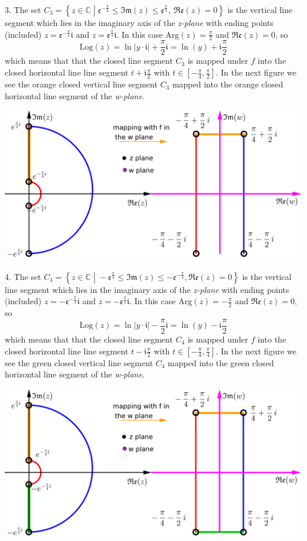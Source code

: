 \documentclass[11pt]{amsart}
\newcommand{\dsp}{\displaystyle}
\newcommand{\BBC}{\mathbb{C}}\newcommand{\mi}{\mathfrak{i}}
\begin{document}
3. The set $\dsp
C_3=\left\{z\in\BBC\;\left|\;\mathfrak{e}^{-\frac{\pi}{4}}\leq\mathfrak{Im}
(z)\leq\mathfrak { e } ^ {\frac{\pi}{4}}, \
\mathfrak{Re}(z)=0\right.\right\}$ is the vertical line segment which lies in the 
imaginary axis of the \textit{z-plane} with ending points (included)
$\dsp z=\mathfrak{e}^{-\frac{\pi}{4}}\mi$ and $z=\mathfrak{e}^{\frac{\pi}{4}}\mi$. In this case $\dsp\textrm{Arg}(z)=\frac{\pi}{2}$ and 
$\dsp\mathfrak{Re}(z)=0$, so \[\textrm{Log}(z)=\ln|y\cdot \mi|+\frac{\pi}{2}\mi=\ln⁡(y)+\mi\frac{\pi}{2}\] which means that that the 
closed line segment $C_3$ is mapped under $f$ into the closed horizontal line line 
segment $\dsp t+\mi\frac{\pi}{2}$ with 
$t\in\left[-\frac{\pi}{4},\frac{\pi}{2}\right]$. In the next figure we see the orange closed vertical line segment $C_3$ mapped into the 
orange closed horizontal line segment of the \textit{w-plane}.
\begin{center}\includegraphics{2c.png}\end{center}
4.  The set 
$C_4=\left\{z\in\BBC\;\left|\;-\mathfrak{e}^{\frac{\pi}{4}}\leq\mathfrak{Im}
(z)\leq-\mathfrak { e }^{-\frac{\pi}{4}}, \mathfrak{Re}(z)=0
\right.\right\}$ is the vertical line segment which lies in the imaginary axis of the 
\textit{z-plane} with ending points (included) 
$\dsp z=-\mathfrak{e}^{-\frac{\pi}{4}}\mi$ and $\dsp z=-\mathfrak{e}^{\frac{\pi}{4}}\mi$. In this case $\dsp\textrm{Arg}(z)=-\frac{\pi}{2}$ 
and $\dsp\mathfrak{Re}(z)=0$, so \[\textrm{Log}(z)=\ln|y\cdot \mi|−\frac{\pi}{2}\mi=\ln⁡(y)−\mi\frac{\pi}{2}\]
which means that that the closed line segment $C_4$ is mapped under $f$ into the closed 
horizontal line line segment 
$\dsp t−\mi\frac{\pi}{2}$ with $t\in\left[-\frac{\pi}{4},\frac{\pi}{4}\right]$. In the next figure we see the green closed vertical line 
segment $C_4$ mapped into the green closed horizontal line segment of the \textit{w-plane}.
\begin{center}\includegraphics{2d.png}\end{center}
\end{document}
